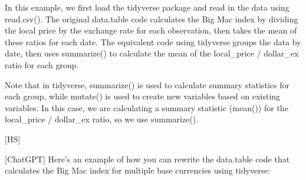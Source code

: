 \documentclass[
]{bxjsbook}
\newenvironment{Shaded}{\begin{snugshade}}{\end{snugshade}}
\newcommand{\CommentTok}[1]{\textcolor[rgb]{0.56,0.35,0.01}{\textit{#1}}}
\newcommand{\ControlFlowTok}[1]{\textcolor[rgb]{0.13,0.29,0.53}{\textbf{#1}}}
\newcommand{\DecValTok}[1]{\textcolor[rgb]{0.00,0.00,0.81}{#1}}
\newcommand{\ErrorTok}[1]{\textcolor[rgb]{0.64,0.00,0.00}{\textbf{#1}}}
\newcommand{\NormalTok}[1]{#1}
\newcommand{\OtherTok}[1]{\textcolor[rgb]{0.56,0.35,0.01}{#1}}
\newcommand{\SpecialCharTok}[1]{\textcolor[rgb]{0.00,0.00,0.00}{#1}}
\theoremstyle{definition}
\theoremstyle{definition}
\theoremstyle{definition}
\theoremstyle{definition}
\theoremstyle{remark}
\begin{document}
In this example, we first load the tidyverse package and read in the data using read.csv(). The original data.table code calculates the Big Mac index by dividing the local price by the exchange rate for each observation, then takes the mean of these ratios for each date. The equivalent code using tidyverse groups the data by date, then uses summarize() to calculate the mean of the local\_price / dollar\_ex ratio for each group.

Note that in tidyverse, summarize() is used to calculate summary statistics for each group, while mutate() is used to create new variables based on existing variables. In this case, we are calculating a summary statistic (mean()) for the local\_price / dollar\_ex ratio, so we use summarize().

{[}HS{]}

\begin{Shaded}
\end{Shaded}

{[}ChatGPT{]} Here's an example of how you can rewrite the data.table code that calculates the Big Mac index for multiple base currencies using tidyverse:
\end{document}
